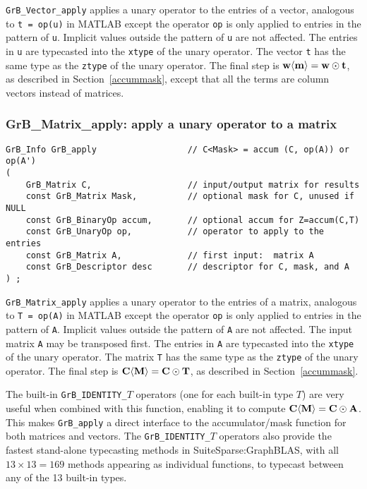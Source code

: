 \documentclass[12pt]{article}
\begin{document}
{\verb'GrB_Vector_apply' applies a unary operator to the entries of a vector,
analogous to \verb't = op(u)'  in MATLAB except the operator \verb'op' is only
applied to entries in the pattern of \verb'u'.  Implicit values outside the
pattern of \verb'u' are not affected.  The entries in \verb'u' are typecasted
into the \verb'xtype' of the unary operator.  The vector \verb't' has the same
type as the \verb'ztype' of the unary operator.  The final step is ${\bf w
\langle m \rangle  = w \odot t}$, as described in Section~\ref{accummask},
except that all the terms are column vectors instead of matrices.

\newpage
\subsubsection{{\sf GrB\_Matrix\_apply:} apply a unary operator to a matrix}
\label{apply_matrix}

\begin{mdframed}[userdefinedwidth=6in]
{\footnotesize
\begin{verbatim}
GrB_Info GrB_apply                  // C<Mask> = accum (C, op(A)) or op(A')
(
    GrB_Matrix C,                   // input/output matrix for results
    const GrB_Matrix Mask,          // optional mask for C, unused if NULL
    const GrB_BinaryOp accum,       // optional accum for Z=accum(C,T)
    const GrB_UnaryOp op,           // operator to apply to the entries
    const GrB_Matrix A,             // first input:  matrix A
    const GrB_Descriptor desc       // descriptor for C, mask, and A
) ;
\end{verbatim} } \end{mdframed}

\verb'GrB_Matrix_apply'
applies a unary operator to the entries of a matrix, analogous to
\verb'T = op(A)'  in MATLAB except the operator \verb'op' is only applied to
entries in the pattern of \verb'A'.  Implicit values outside the pattern of
\verb'A' are not affected.  The input matrix \verb'A' may be transposed first.
The entries in \verb'A' are typecasted into the \verb'xtype' of the unary
operator.  The matrix \verb'T' has the same type as the \verb'ztype' of the
unary operator.  The final step is ${\bf C \langle M \rangle  = C \odot T}$, as
described in Section~\ref{accummask}.

The built-in \verb'GrB_IDENTITY_'$T$ operators (one for each built-in type $T$)
are very useful when combined with this function, enabling it to compute ${\bf
C \langle M \rangle  = C \odot A}$.  This makes \verb'GrB_apply' a direct
interface to the accumulator/mask function for both matrices and vectors.
The \verb'GrB_IDENTITY_'$T$ operators also provide the fastest stand-alone
typecasting methods in SuiteSparse:GraphBLAS, with all $13 \times 13=169$
methods appearing as individual functions, to typecast between any of the 13
built-in types.

}
\end{document}
